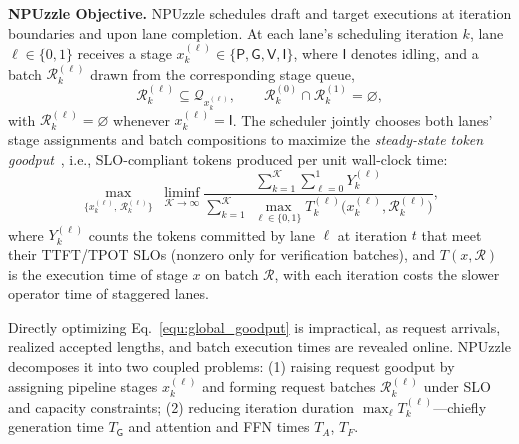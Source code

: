 \documentclass[sigconf,nonacm,10pt]{acmart}
\newcommand{\name}{NPUzzle\xspace}
\begin{document}
\noindent\textbf{\name Objective.}
\name schedules draft and target executions at iteration boundaries and upon lane completion. At each lane's scheduling iteration $k$, lane $\ell\in\{0,1\}$ receives a stage $x_k^{(\ell)}\in\{\mathsf P,\mathsf G,\mathsf V,\mathsf I\}$, where $\mathsf I$ denotes idling, and a batch $\mathcal R_k^{(\ell)}$ drawn from the corresponding stage queue,
\begin{equation}
\mathcal R_k^{(\ell)}\subseteq\mathcal Q_{x_k^{(\ell)}},
\qquad
\mathcal R_k^{(0)}\cap\mathcal R_k^{(1)}=\varnothing,
\label{equ:lane_request_sets}
\end{equation}
with $\mathcal R_k^{(\ell)}=\varnothing$ whenever $x_k^{(\ell)}=\mathsf I$. The scheduler jointly chooses both lanes' stage assignments and batch compositions to maximize the \emph{steady-state token goodput}~\cite{Zhang2026JITServe}, i.e., SLO-compliant tokens produced per unit wall-clock time:
\begin{equation}
\max_{\{x_k^{(\ell)},\,\mathcal R_k^{(\ell)}\}}\;
\liminf_{\mathcal K\rightarrow\infty}
\frac{\displaystyle\sum_{k=1}^{\mathcal K}\sum_{\ell=0}^{1} Y_k^{(\ell)}}
{\displaystyle\sum_{k=1}^{\mathcal K}\;\max_{\ell\in\{0,1\}} T_k^{(\ell)}\bigl(x_k^{(\ell)},\mathcal R_k^{(\ell)}\bigr)},
\label{equ:global_goodput}
\end{equation}
where $Y_k^{(\ell)}$ counts the tokens committed by lane $\ell$ at iteration $t$ that meet their TTFT/TPOT SLOs (nonzero only for verification batches), and $T(x,\mathcal R)$ is the execution time of stage $x$ on batch $\mathcal R$, with each iteration costs the slower operator time of staggered lanes.

Directly optimizing Eq.~\eqref{equ:global_goodput} is impractical, as request arrivals, realized accepted lengths, and batch execution times are revealed online. \name decomposes it into two coupled problems: {\color{red}(1) raising request goodput by assigning pipeline stages $x_k^{(\ell)}$ and forming request batches $\mathcal R_k^{(\ell)}$ under SLO and capacity constraints; (2) reducing iteration duration $\max_{\ell} T_k^{(\ell)}$---chiefly generation time $T_{\mathsf G}$ and attention and FFN times $T_A$, $T_F$}.
\end{document}
